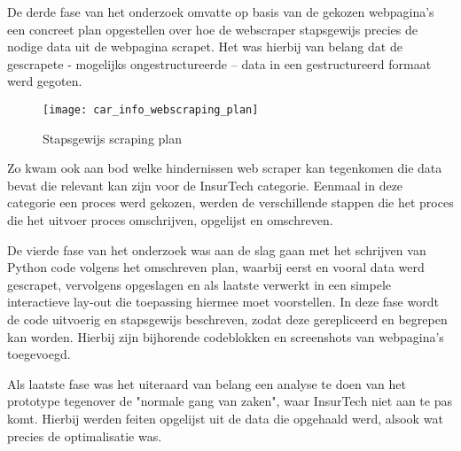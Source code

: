 De derde fase van het onderzoek omvatte op basis van de gekozen webpagina's een concreet plan opgestellen over hoe de webscraper stapsgewijs precies de nodige data uit de webpagina scrapet. Het was hierbij van belang dat de gescrapete - mogelijks ongestructureerde – data in een gestructureerd formaat werd gegoten.

\begin{figure}[H]
	\centering
	\texttt{[image: car\_info\_webscraping\_plan]}
	\caption{Stapsgewijs scraping plan}
\end{figure}

Zo kwam ook aan bod welke hindernissen web scraper kan tegenkomen die data bevat die relevant kan zijn voor de InsurTech categorie. Eenmaal in deze categorie een proces werd gekozen, werden de verschillende stappen die het proces die het uitvoer proces omschrijven, opgelijst en omschreven.

De vierde fase van het onderzoek was aan de slag gaan met het schrijven van Python code volgens het omschreven plan, waarbij eerst en vooral data werd gescrapet, vervolgens opgeslagen en als laatste verwerkt in een simpele interactieve lay-out die toepassing hiermee moet voorstellen. In deze fase wordt de code uitvoerig en stapsgewijs beschreven, zodat deze gerepliceerd en begrepen kan worden. Hierbij zijn bijhorende codeblokken en screenshots van webpagina's toegevoegd.

Als laatste fase was het uiteraard van belang een analyse te doen van het prototype tegenover de "normale gang van zaken", waar InsurTech niet aan te pas komt. Hierbij werden feiten opgelijst uit de data die opgehaald werd, alsook wat precies de optimalisatie was.


